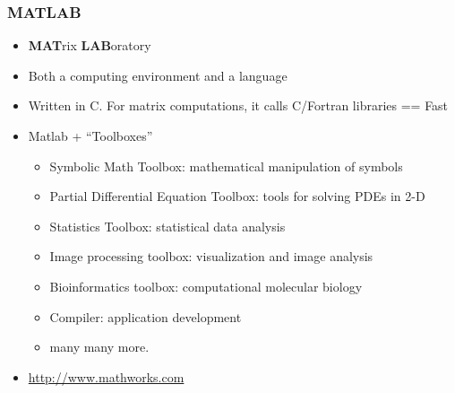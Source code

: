 \documentclass[10pt]{beamer}
\begin{document}
\begin{frame}
\frametitle{MATLAB}
\begin{itemize}
\item {\bf MAT}rix {\bf LAB}oratory
\item Both a computing environment and a language
\item Written in C. For matrix computations, it calls C/Fortran libraries == Fast
\item Matlab + ``Toolboxes''
  \begin{itemize}
  \item Symbolic Math Toolbox: mathematical manipulation of symbols
  \item Partial Differential Equation Toolbox: tools for solving PDEs in 2-D
  \item Statistics Toolbox: statistical data analysis
  \item Image processing toolbox: visualization and image analysis
  \item Bioinformatics toolbox: computational molecular biology
  \item Compiler: application development
  \item many many more.
  \end{itemize}
\item {\url{http://www.mathworks.com}}
\end{itemize}
\end{frame}
\end{document}
